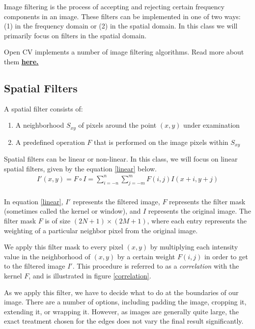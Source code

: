 \documentclass[twoside]{article}
\begin{document}
Image filtering is the process of accepting and rejecting certain frequency components in an image. These filters can be implemented in one of two ways: (1) in the frequency domain or (2) in the spatial domain. In this class we will primarily focus on filters in the spatial domain.

Open CV implements a number of image filtering algorithms. Read more about them \href{https://docs.opencv.org/3.0-beta/modules/imgproc/doc/filtering.html}{\textbf{here.}}

\subsection{Spatial Filters}
A spatial filter consists of:
\begin{enumerate}
  \item A neighborhood $S_{xy}$ of pixels around the point $(x,y)$ under examination
  \item A predefined operation $F$ that is performed on the image pixels within $S_{xy}$
\end{enumerate}

Spatial filters can be linear or non-linear. In this class, we will focus on linear spatial filters, given by the equation \ref{linear} below.
\begin{equation}
  \label{linear}
  \begin{aligned}
    I'(x,y) = F \circ I = \sum_{i=-n}^n \sum_{j=-m}^m F(i,j)I(x+i,y+j)\\
  \end{aligned}
\end{equation}

In equation \ref{linear}, $I'$ represents the filtered image, $F$ represents the filter mask (sometimes called the kernel or window), and $I$ represents the original image. The filter mask $F$ is of size $(2N + 1)\times(2M + 1)$, where each entry represents the weighting of a particular neighbor pixel from the original image.

We apply this filter mask to every pixel $(x,y)$ by multiplying each intensity value in the neighborhood of $(x,y)$ by a certain weight $F(i,j)$ in order to get to the filtered image $I'$. This procedure is referred to as a \textit{correlation} with the kernel $F$, and is illustrated in figure \ref{correlation}. 

As we apply this filter, we have to decide what to do at the boundaries of our image. There are a number of options, including padding the image, cropping it, extending it, or wrapping it. However, as images are generally quite large, the exact treatment chosen for the edges does not vary the final result significantly.
\end{document}
